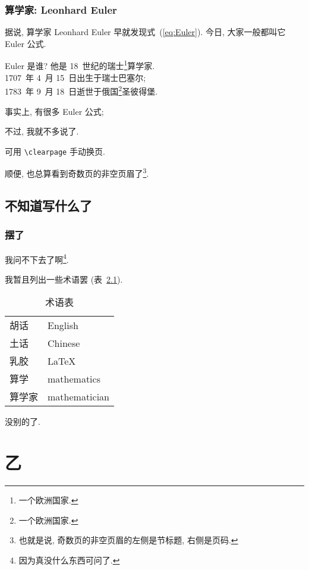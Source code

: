 \documentclass[fontset=fandol]{ctexbook}
\begin{document}
\section{算学家: Leonhard Euler}

据说, 算学家 Leonhard Euler 早就发现式~(\ref{eq:Euler}).
今日, 大家一般都叫它 Euler 公式.

Euler 是谁?
他是 18~世纪的瑞士\footnote{一个欧洲国家.}算学家.\\
1707~年 4~月 15~日出生于瑞士巴塞尔;\\
1783~年 9~月 18~日逝世于俄国\footnote{一个欧洲国家.}圣彼得堡.

事实上, 有很多 Euler 公式;\par
不过, 我就不多说了.

\clearpage%

可用 \verb/\clearpage/ 手动换页.

顺便, 也总算看到奇数页的非空页眉了\footnote{也就是说,
    奇数页的非空页眉的左侧是节标题, 右侧是页码.}.

\chapter{不知道写什么了}

\section{摆了}

我问不下去了啊\footnote{因为真没什么东西可问了.}.

我暂且列出一些术语罢 (表~\ref{tab:glossaries}).

\begin{table}[h!]
    \centering
    \caption{术语表}\label{tab:glossaries}
    \begin{tabular}{l l}
        \hline
        胡话   & English       \\
        土话   & Chinese       \\
        乳胶   & \LaTeX{}      \\
        算学   & mathematics   \\
        算学家 & mathematician \\
        \hline
    \end{tabular}
\end{table}

没别的了.

\part{乙}
\end{document}
